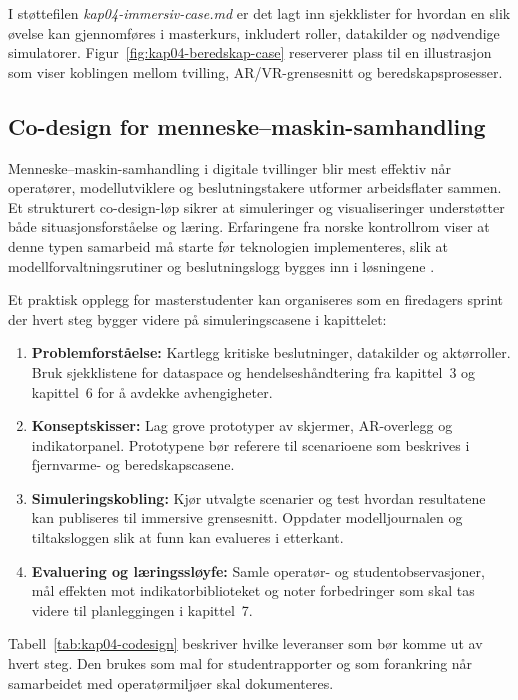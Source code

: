 I støttefilen \textit{kap04-immersiv-case.md} er det lagt inn sjekklister for hvordan en slik øvelse kan gjennomføres i masterkurs, inkludert roller, datakilder og nødvendige simulatorer. Figur~\ref{fig:kap04-beredskap-case} reserverer plass til en illustrasjon som viser koblingen mellom tvilling, AR/VR-grensesnitt og beredskapsprosesser.

\subsection{Co-design for menneske--maskin-samhandling}
Menneske--maskin-samhandling i digitale tvillinger blir mest effektiv når operatører, modellutviklere og beslutningstakere utformer arbeidsflater sammen. Et strukturert co-design-løp sikrer at simuleringer og visualiseringer understøtter både situasjonsforståelse og læring. Erfaringene fra norske kontrollrom viser at denne typen samarbeid må starte før teknologien implementeres, slik at modellforvaltningsrutiner og beslutningslogg bygges inn i løsningene \citep{kongsberg2023kognitwin,statnett2024kontrolltarn}.

Et praktisk opplegg for masterstudenter kan organiseres som en firedagers sprint der hvert steg bygger videre på simuleringscasene i kapittelet:
\begin{enumerate}
    \item \textbf{Problemforståelse:} Kartlegg kritiske beslutninger, datakilder og aktørroller. Bruk sjekklistene for dataspace og hendelseshåndtering fra kapittel~3 og kapittel~6 for å avdekke avhengigheter.
    \item \textbf{Konseptskisser:} Lag grove prototyper av skjermer, AR-overlegg og indikatorpanel. Prototypene bør referere til scenarioene som beskrives i fjernvarme- og beredskapscasene.
    \item \textbf{Simuleringskobling:} Kjør utvalgte scenarier og test hvordan resultatene kan publiseres til immersive grensesnitt. Oppdater modelljournalen og tiltaksloggen slik at funn kan evalueres i etterkant.
    \item \textbf{Evaluering og læringssløyfe:} Samle operatør- og studentobservasjoner, mål effekten mot indikatorbiblioteket og noter forbedringer som skal tas videre til planleggingen i kapittel~7.
\end{enumerate}

Tabell~\ref{tab:kap04-codesign} beskriver hvilke leveranser som bør komme ut av hvert steg. Den brukes som mal for studentrapporter og som forankring når samarbeidet med operatørmiljøer skal dokumenteres.

